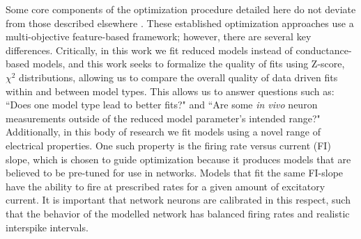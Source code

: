 

Some core components of the optimization procedure detailed here do not deviate from those described elsewhere \citep{druckmann2008evaluating,bluepyopt}. These established optimization approaches use a multi-objective feature-based framework; however, there are several key differences. Critically, in this work we fit reduced models instead of conductance-based models, and this work seeks to formalize the quality of fits using Z-score, $\chi^{2}$ distributions, allowing us to compare the overall quality of data driven fits within and between model types. This allows us to answer questions such as: ``Does one model type lead to better fits?" and ``Are some \emph{in vivo} neuron measurements outside of the reduced model parameter's intended range?" %
Additionally, in this body of research we fit models using a novel range of electrical properties. One such property is the firing rate versus current (FI) slope, which is chosen to guide optimization because it produces models that are believed to be pre-tuned for use in networks. Models that fit the same FI-slope have the ability to fire at prescribed rates for a given amount of excitatory current. It is important that network neurons are calibrated in this respect, such that the behavior of the modelled network has  balanced firing rates and realistic interspike intervals.